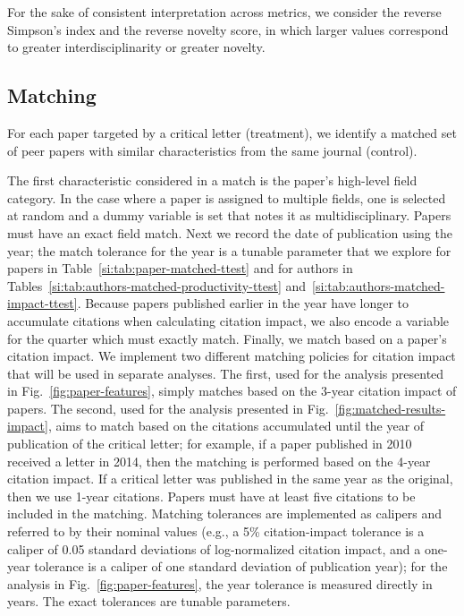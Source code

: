\documentclass[12pt,a4paper]{article}
\numberwithin{equation}{section}
\begin{document}
For the sake of consistent interpretation across metrics, we consider the reverse Simpson's index and the reverse novelty score, in which larger values correspond to greater interdisciplinarity or greater novelty. 


\subsection*{Matching}
For each paper targeted by a critical letter (treatment), we identify a matched set of peer papers with similar characteristics from the same journal (control). 

The first characteristic considered in a match is the paper's high-level field category. 
In the case where a paper is assigned to multiple fields, one is selected at random and a dummy variable is set that notes it as multidisciplinary. 
Papers must have an exact field match. 
Next we record the date of publication using the year; the match tolerance for the year is a tunable parameter that we explore for papers in Table~\ref*{si:tab:paper-matched-ttest} and for authors in Tables~\ref*{si:tab:authors-matched-productivity-ttest} and~\ref*{si:tab:authors-matched-impact-ttest}.
Because papers published earlier in the year have longer to accumulate citations when calculating citation impact, we also encode a variable for the quarter which must exactly match. 
Finally, we match based on a paper's citation impact.
We implement two different matching policies for citation impact that will be used in separate analyses. 
The first, used for the analysis presented in Fig.~\ref*{fig:paper-features}, simply matches based on the 3-year citation impact of papers.
The second, used for the analysis presented in Fig.~\ref*{fig:matched-results-impact}, aims to match based on the citations accumulated until the year of publication of the critical letter; for example, if a paper published in 2010 received a letter in 2014, then the matching is performed based on the 4-year citation impact.
If a critical letter was published in the same year as the original, then we use 1-year citations.
Papers must have at least five citations to be included in the matching. 
Matching tolerances are implemented as calipers and referred to by their nominal values (e.g., a 5\% citation-impact tolerance is a caliper of 0.05 standard deviations of log-normalized citation impact, and a one-year tolerance is a caliper of one standard deviation of publication year); for the analysis in Fig.~\ref*{fig:paper-features}, the year tolerance is measured directly in years. The exact tolerances are tunable parameters.
\end{document}
